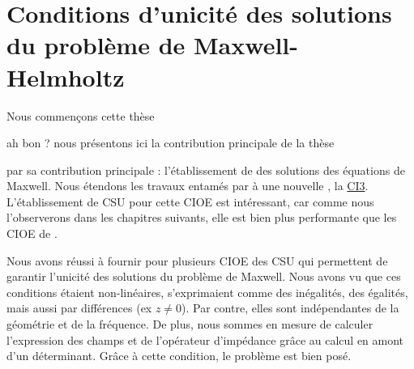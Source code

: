 \chapter[Unicité des solutions de Maxwell]{Conditions d'unicité des solutions du problème de Maxwell-Helmholtz}
\label{sec:csu}
\minitoc
\newpage
{}
Nous commençons cette thèse
\begin{REM}
	ah bon ? nous présentons ici la contribution principale de la thèse
\end{REM} par sa contribution principale : l'établissement de  des solutions des équations de Maxwell.
Nous étendons les travaux entamés par \cite{stupfel_sufficient_2011} à une nouvelle , la \hyperlink{ci3}{CI3}.
L'établissement de CSU pour cette CIOE est intéressant, car comme nous l'observerons dans les chapitres suivants, elle est bien plus performante que les CIOE de \cite{stupfel_sufficient_2011}.





Nous avons réussi à fournir pour plusieurs CIOE des CSU qui permettent de garantir l'unicité des solutions du problème de Maxwell.
Nous avons vu que ces conditions étaient non-linéaires, s'exprimaient comme des inégalités, des égalités, mais aussi par différences (ex \(z\not=0\)).
Par contre, elles sont indépendantes de la géométrie et de la fréquence.
De plus, nous sommes en mesure de calculer l'expression des champs et de l'opérateur d'impédance grâce au calcul en amont d'un déterminant.
Grâce à cette condition, le problème est bien posé.